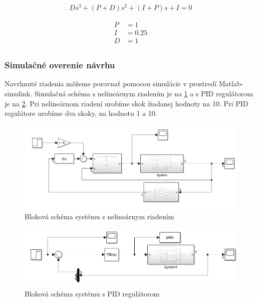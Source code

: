 \documentclass[../main.tex]{subfiles}
\begin{document}
\begin{equation}
		\begin{aligned}
		Ds^3+(P+D)s^2+(I+P)s+I=0
		\end{aligned}
		\label{eqn:svlvs2_nasaURO}
	\end{equation}

\begin{equation}
		\begin{aligned}
		P &= 1 						\\
		I &= 0.25 						\\
		D &= 1						 \\
		\end{aligned}
		\label{eqn:svlvs2_parametrePID}
	\end{equation}

\newpage
\subsubsection{Simulačné overenie návrhu}

Navrhnuté riadenia môžeme porovnať pomocou simulácie v prostredí Matlab-simulink. Simulačná schéma s nelineárnym riadením je na \cref{fig:svlvs2_modelRiadenia} a s PID regulátorom je na \cref{fig:svlvs2_modelRiadeniaPID}. Pri nelineárnom riadení urobíme skok žiadanej hodnoty na 10. Pri PID regulátore urobíme dva skoky, na hodnotu 1 a 10.
	\begin{figure}[h!]
		\centering
		\includegraphics[width=0.8\linewidth]{ModelRiadenia}
		\caption{Bloková schéma systému s nelineárnym riadením}
		\label{fig:svlvs2_modelRiadenia}
	\end{figure}

	\begin{figure}[h!]
		\centering
		\includegraphics[width=0.8\linewidth]{ModelRiadeniaPID}
		\caption{Bloková schéma systému s PID regulátorom}
		\label{fig:svlvs2_modelRiadeniaPID}
	\end{figure}
\end{document}
